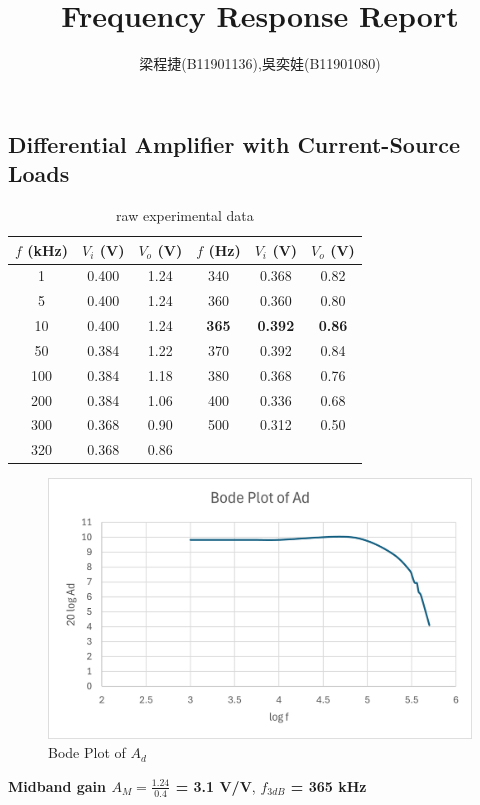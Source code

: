 \documentclass{article}
\title{Frequency Response Report}
\author{梁程捷(B11901136),吳奕娃(B11901080)}
\date{}
\begin{document}
\begin{CJK*}{UTF8}{bkai}
\maketitle

\section*{Differential Amplifier with Current-Source Loads}
\begin{minipage}{0.5\textwidth}
\begin{table}[H]
\begin{tabular}{|c|c|c||c|c|c|}
    \hline
    $f$ (\unit{\kilo\hertz}) &  $V_i$ (V)& $V_o$ (V) & $f$ (\unit{\hertz}) &  $V_i$ (V)& $V_o$ (V)\\
    \hline\hline
    1	& 0.400 & 1.24 & 340    & 0.368 & 0.82   \\
    5   & 0.400 & 1.24 & 360    & 0.360 & 0.80  \\
    10	& 0.400 & 1.24 & \textbf{365}& \textbf{0.392} & \textbf{0.86}\\
    50	& 0.384 & 1.22 & 370    & 0.392 & 0.84   \\
    100	& 0.384 & 1.18 & 380    & 0.368 & 0.76   \\
    200	& 0.384 & 1.06 & 400    & 0.336 & 0.68   \\
    300	& 0.368 & 0.90 & 500    & 0.312 & 0.50   \\
    320	& 0.368 & 0.86 &        &      &        \\

\hline
\end{tabular}
\caption{raw experimental data}
\end{table}
\end{minipage}\hspace{20mm}
\begin{minipage}{0.5\textwidth}
    \begin{figure}[H]    
        \includegraphics[scale=0.55]{Ad_bode_plot.png}
        \caption{Bode Plot of $A_d$}
    \end{figure}
\end{minipage}
\vspace{3mm}
\textbf{Midband gain $A_M = \frac{1.24}{0.4}$ = 3.1 V/V}, \textbf{$f_{3dB}$ = 365 \unit{\kilo\hertz}}


\end{CJK*}
\end{document}
